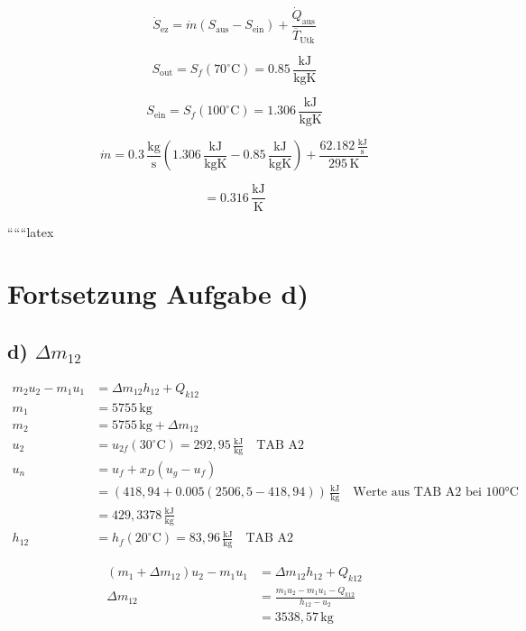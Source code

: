 \[
\dot{S}_{\text{ez}} = \dot{m} \left( S_{\text{aus}} - S_{\text{ein}} \right) + \frac{\dot{Q}_{\text{aus}}}{\overline{T}_{\text{Utk}}}
\]

\[
S_{\text{out}} = S_f (70^\circ \text{C}) = 0.85 \, \frac{\text{kJ}}{\text{kgK}}
\]

\[
S_{\text{ein}} = S_f (100^\circ \text{C}) = 1.306 \, \frac{\text{kJ}}{\text{kgK}}
\]

\[
\dot{m} = 0.3 \, \frac{\text{kg}}{\text{s}} \left( 1.306 \, \frac{\text{kJ}}{\text{kgK}} - 0.85 \, \frac{\text{kJ}}{\text{kgK}} \right) + \frac{62.182 \, \frac{\text{kJ}}{\text{s}}}{295 \, \text{K}}
\]

\[
= 0.316 \, \frac{\text{kJ}}{\text{K}}
\]

``````latex


\section*{Fortsetzung Aufgabe d)}

\subsection*{d) $\Delta m_{12}$}

\begin{align*}
m_2 u_2 - m_1 u_1 &= \Delta m_{12} h_{12} + Q_{k12} \\
m_1 &= 5755 \, \text{kg} \\
m_2 &= 5755 \, \text{kg} + \Delta m_{12} \\
u_2 &= u_{2f} (30^\circ \text{C}) = 292,95 \, \frac{\text{kJ}}{\text{kg}} \quad \text{TAB A2} \\
u_n &= u_f + x_D (u_g - u_f) \\
&= (418,94 + 0.005 (2506,5 - 418,94)) \, \frac{\text{kJ}}{\text{kg}} \quad \text{Werte aus TAB A2 bei 100°C} \\
&= 429,3378 \, \frac{\text{kJ}}{\text{kg}} \\
h_{12} &= h_f (20^\circ \text{C}) = 83,96 \, \frac{\text{kJ}}{\text{kg}} \quad \text{TAB A2}
\end{align*}

\begin{align*}
(m_1 + \Delta m_{12}) u_2 - m_1 u_1 &= \Delta m_{12} h_{12} + Q_{k12} \\
\Delta m_{12} &= \frac{m_1 u_2 - m_1 u_1 - Q_{k12}}{h_{12} - u_2} \\
&= 3538,57 \, \text{kg}
\end{align*}

